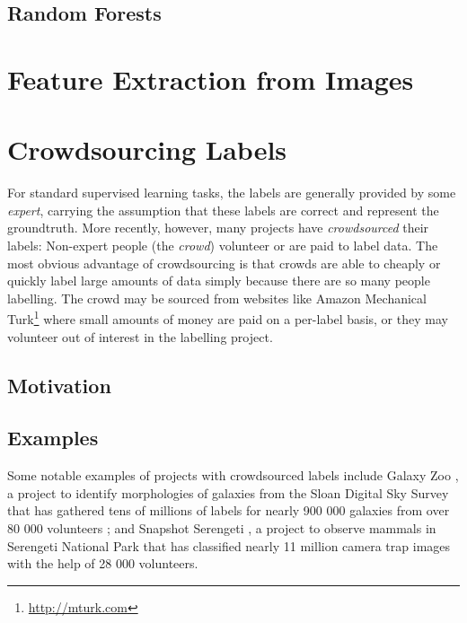     \subsection{Random Forests}
    \label{sec:random-forests}

\section{Feature Extraction from Images}
\label{sec:image-features}

\section{Crowdsourcing Labels}
\label{sec:crowdsourcing}

    For standard supervised learning tasks, the labels are generally
    provided by some \emph{expert}, carrying the assumption that these
    labels are correct and represent the groundtruth. More recently,
    however, many projects have \emph{crowdsourced} their labels: Non-expert
    people (the \emph{crowd}) volunteer or are paid to label data. The most
    obvious advantage of crowdsourcing is that crowds are able to cheaply or
    quickly label large amounts of data simply because there are so many
    people labelling. The crowd may be sourced from websites like Amazon
    Mechanical Turk\footnote{\url{http://mturk.com}} where small amounts of
    money are paid on a per-label basis, or they may volunteer out of
    interest in the labelling project.

    \subsection{Motivation}
    \label{sec:crowdsourcing-motivation}


    \subsection{Examples}
    \label{sec:crowdsourcing-examples}

        Some notable examples of projects with crowdsourced labels include
        Galaxy Zoo \citep{lintott08}, a project to identify morphologies of
        galaxies from the Sloan Digital Sky Survey that has gathered tens of
        millions of labels for nearly 900 000 galaxies from over 80 000
        volunteers \citep{lintott11}; and Snapshot Serengeti \citep{swanson15},
        a project to observe mammals in Serengeti National Park that has
        classified nearly 11 million camera trap images with the help of 28 000
        volunteers.

